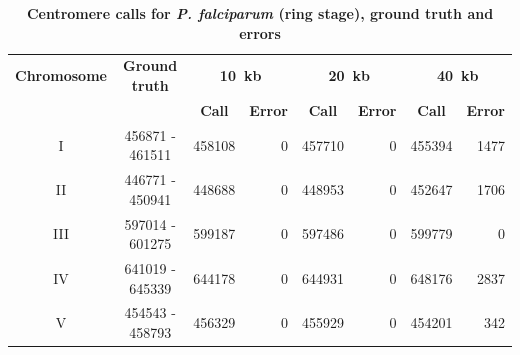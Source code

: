 \begin{table}[ht!]
\caption{\textbf{Centromere calls for \textit{P. falciparum} (ring stage),
ground truth and errors}}
\small
\vspace{10pt}
\begin{center}
\begin{tabular}{c | c  r  r  r  r r r}
\textbf{Chromosome}  & \textbf{Ground truth} & \multicolumn{2}{c}{\textbf{10~kb}} & \multicolumn{2}{c}{\textbf{20~kb}} & \multicolumn{2}{c}{\textbf{40~kb}} \\
  &   &  \multicolumn{1}{c}{\textbf{Call}} &  \multicolumn{1}{c}{\textbf{Error}} &  \multicolumn{1}{c}{\textbf{Call}} &  \multicolumn{1}{c}{\textbf{Error}} &  \multicolumn{1}{c}{\textbf{Call}} &  \multicolumn{1}{c}{\textbf{Error}} \\
\hline
I & \num[group-separator={\,}]{456871} - \num[group-separator={\,}]{461511} & \num[group-separator={\,}]{458108} & \small{\num[group-separator={\,}]{0}}  & \num[group-separator={\,}]{457710} & \small{\num[group-separator={\,}]{0}}  & \num[group-separator={\,}]{455394} & \small{\num[group-separator={\,}]{1477}}  \\
II & \num[group-separator={\,}]{446771} - \num[group-separator={\,}]{450941} & \num[group-separator={\,}]{448688} & \small{\num[group-separator={\,}]{0}}  & \num[group-separator={\,}]{448953} & \small{\num[group-separator={\,}]{0}}  & \num[group-separator={\,}]{452647} & \small{\num[group-separator={\,}]{1706}}  \\
III & \num[group-separator={\,}]{597014} - \num[group-separator={\,}]{601275} & \num[group-separator={\,}]{599187} & \small{\num[group-separator={\,}]{0}}  & \num[group-separator={\,}]{597486} & \small{\num[group-separator={\,}]{0}}  & \num[group-separator={\,}]{599779} & \small{\num[group-separator={\,}]{0}}  \\
IV & \num[group-separator={\,}]{641019} - \num[group-separator={\,}]{645339} & \num[group-separator={\,}]{644178} & \small{\num[group-separator={\,}]{0}}  & \num[group-separator={\,}]{644931} & \small{\num[group-separator={\,}]{0}}  & \num[group-separator={\,}]{648176} & \small{\num[group-separator={\,}]{2837}}  \\
V & \num[group-separator={\,}]{454543} - \num[group-separator={\,}]{458793} & \num[group-separator={\,}]{456329} & \small{\num[group-separator={\,}]{0}}  & \num[group-separator={\,}]{455929} & \small{\num[group-separator={\,}]{0}}  & \num[group-separator={\,}]{454201} & \small{\num[group-separator={\,}]{342}}  \\

\end{tabular}
\end{center}
\end{table}
